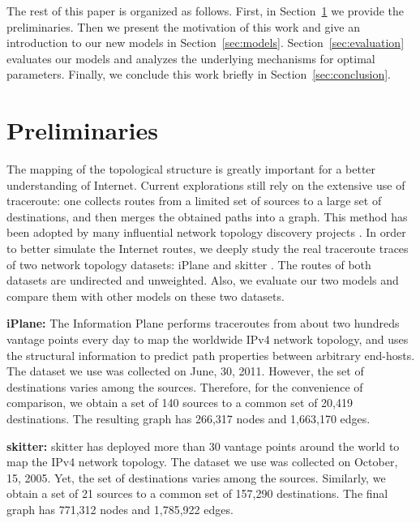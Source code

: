 \documentclass[a4paper]{llncs}
\begin{document}
The rest of this paper is organized as follows. First, in
Section~\ref{sec:preliminaries} we provide the preliminaries. Then
we present the motivation of this work and give an introduction to
our new models in Section~\ref{sec:models}.
Section~\ref{sec:evaluation} evaluates our models and analyzes the
underlying mechanisms for optimal parameters.
Finally, we conclude this work briefly in
Section~\ref{sec:conclusion}.

\section{Preliminaries}
\label{sec:preliminaries}

The mapping of the topological structure is greatly important
for a better understanding of Internet. Current explorations
still rely on the extensive use of traceroute: one
collects routes from a limited set of sources to a large set of
destinations, and then merges the obtained paths into a graph. This
method has been adopted by many influential network topology discovery
projects
\cite{Skitter,Scamper,DIMES,iPlane,Heuristics,Rocketfuel,NTC}.
In order to better simulate the Internet routes, we deeply study the real
traceroute traces of two network topology datasets: iPlane
\cite{iPlane} and skitter \cite{Skitter}. The routes of both datasets are undirected and unweighted. Also, we evaluate
our two models and compare them with other models on these two datasets.

\textbf{iPlane:} The Information Plane performs traceroutes from about two hundreds vantage points every day to map the worldwide IPv4 network topology, and uses the structural information to predict path properties between arbitrary end-hosts. The dataset we use was collected on June, 30, 2011. However, the set of destinations varies among the sources. Therefore, for the convenience of comparison, we obtain a set of 140 sources to a common set of 20,419 destinations. The resulting graph has 266,317 nodes and 1,663,170 edges.

\textbf{skitter:} skitter has deployed more than 30 vantage points around the world to map the IPv4 network topology. The dataset we use was collected on October, 15, 2005. Yet, the set of destinations varies among the sources. Similarly, we obtain a set of 21 sources to a common set of 157,290 destinations. The final graph has 771,312 nodes and 1,785,922 edges.
\end{document}
